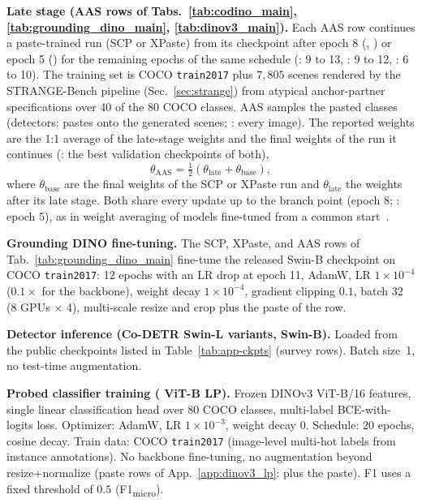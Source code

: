 \noindent\textbf{Late stage (AAS rows of Tabs.~\ref{tab:codino_main}, \ref{tab:grounding_dino_main}, \ref{tab:dinov3_main}).} Each AAS row continues a paste-trained run (SCP or XPaste) from its checkpoint after epoch 8 (\codino{}, \gdino{}) or epoch 5 (\dinov{}) for the remaining epochs of the same schedule (\codino{}: 9 to 13, \gdino{}: 9 to 12, \dinov{}: 6 to 10). The training set is COCO \texttt{train2017} plus $7{,}805$ scenes rendered by the STRANGE-Bench pipeline (Sec.~\ref{sec:strange}) from atypical anchor-partner specifications over 40 of the 80 COCO classes. AAS samples the pasted classes (detectors: pastes onto the generated scenes; \dinov{}: every image). The reported weights are the 1:1 average of the late-stage weights and the final weights of the run it continues (\dinov{}: the best validation checkpoints of both),
\begin{equation}
\theta_{\text{AAS}} = \tfrac{1}{2}\left(\theta_{\text{late}} + \theta_{\text{base}}\right),
\label{eq:late_avg}
\end{equation}
where $\theta_{\text{base}}$ are the final weights of the SCP or XPaste run and $\theta_{\text{late}}$ the weights after its late stage. Both share every update up to the branch point (epoch 8; \dinov{}: epoch 5), as in weight averaging of models fine-tuned from a common start~\cite{wortsman2022model,wortsman2022robust}.

\noindent\textbf{Grounding DINO fine-tuning.} The SCP, XPaste, and AAS rows of Tab.~\ref{tab:grounding_dino_main} fine-tune the released Swin-B checkpoint on COCO \texttt{train2017}: 12 epochs with an LR drop at epoch 11, AdamW, LR $1{\times}10^{-4}$ ($0.1\times$ for the backbone), weight decay $1{\times}10^{-4}$, gradient clipping $0.1$, batch 32 (8 GPUs $\times$ 4), multi-scale resize and crop plus the paste of the row.

\noindent\textbf{Detector inference (Co-DETR Swin-L variants, \gdino{}
Swin-B).} Loaded from the public checkpoints listed in Table~\ref{tab:app-ckpts} (survey rows). Batch size~1, no test-time augmentation.

\noindent\textbf{Probed classifier training (\dinov{} ViT-B LP).} 
Frozen DINOv3 ViT-B/16 features, single linear classification head over
$80$ COCO classes, multi-label BCE-with-logits loss. Optimizer: AdamW, 
LR $1{\times}10^{-3}$, weight decay $0$. Schedule: 20 epochs, cosine decay. Train data: COCO \texttt{train2017} (image-level multi-hot labels from instance annotations). No backbone fine-tuning, no augmentation beyond resize+normalize (paste rows of App.~\ref{app:dinov3_lp}: plus the paste). F1 uses a fixed threshold of $0.5$ (F1\textsubscript{micro}). 


